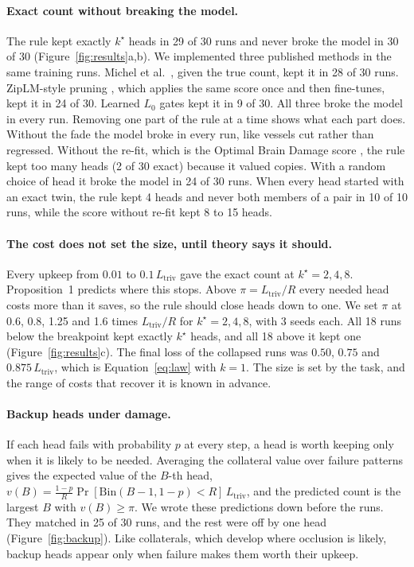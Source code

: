\documentclass[letterpaper]{article} %
\newcommand{\Ltriv}{L_{\mathrm{triv}}}
\newcommand{\kstar}{k^\star}
\begin{document}
\paragraph{Exact count without breaking the model.} The rule kept exactly $\kstar$ heads in 29 of 30 runs and never broke the model in 30 of 30 (Figure~\ref{fig:results}a,b). We implemented three published methods in the same training runs. Michel et al.\ \citep{michel2019sixteen}, given the true count, kept it in 28 of 30 runs. ZipLM-style pruning \citep{ziplm}, which applies the same score once and then fine-tunes, kept it in 24 of 30. Learned $L_0$ gates \citep{voita2019analyzing,louizos2018learning} kept it in 9 of 30. All three broke the model in every run. Removing one part of the rule at a time shows what each part does. Without the fade the model broke in every run, like vessels cut rather than regressed. Without the re-fit, which is the Optimal Brain Damage score \citep{obd}, the rule kept too many heads (2 of 30 exact) because it valued copies. With a random choice of head it broke the model in 24 of 30 runs. When every head started with an exact twin, the rule kept 4 heads and never both members of a pair in 10 of 10 runs, while the score without re-fit kept 8 to 15 heads.

\paragraph{The cost does not set the size, until theory says it should.} Every upkeep from $0.01$ to $0.1\,\Ltriv$ gave the exact count at $\kstar=2,4,8$. Proposition~1 predicts where this stops. Above $\pi=\Ltriv/R$ every needed head costs more than it saves, so the rule should close heads down to one. We set $\pi$ at 0.6, 0.8, 1.25 and 1.6 times $\Ltriv/R$ for $\kstar=2,4,8$, with 3 seeds each. All 18 runs below the breakpoint kept exactly $\kstar$ heads, and all 18 above it kept one (Figure~\ref{fig:results}c). The final loss of the collapsed runs was $0.50$, $0.75$ and $0.875\,\Ltriv$, which is Equation~\eqref{eq:law} with $k=1$. The size is set by the task, and the range of costs that recover it is known in advance.

\paragraph{Backup heads under damage.} If each head fails with probability $p$ at every step, a head is worth keeping only when it is likely to be needed. Averaging the collateral value over failure patterns gives the expected value of the $B$-th head, $v(B)=\frac{1-p}{R}\Pr[\mathrm{Bin}(B-1,1-p)<R]\,\Ltriv$, and the predicted count is the largest $B$ with $v(B)\ge\pi$. We wrote these predictions down before the runs. They matched in 25 of 30 runs, and the rest were off by one head (Figure~\ref{fig:backup}). Like collaterals, which develop where occlusion is likely, backup heads appear only when failure makes them worth their upkeep.
\end{document}
